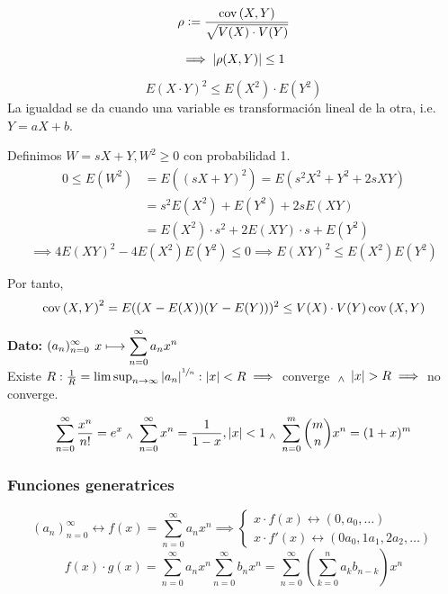 \begin{defn}
	\[\rho\vcentcolon= \frac{\operatorname{cov}\left(X, Y\right)}{\sqrt{V(X)\cdot V(Y)}}\]
\end{defn}
\[\implies \left|\rho(X, Y)\right| \leq 1\]
\begin{prop}
	\[E(X\cdot Y)^2 \leq E(X^2)\cdot E(Y^2)\]
	La igualdad se da cuando una variable es transformación lineal de la otra, i.e. $Y=aX+b$.
	\begin{dem}
		Definimos $W=sX+Y, W^2\geq 0$ con probabilidad 1.
		\begin{align*}
			0  \leq E\left(W^2\right) & =E\left((sX+Y)^2\right)=E\left(s^2X^2+Y^2+2sXY\right) \\
			                          & = s^2E\left(X^2\right)+E\left(Y^2\right)+2sE(XY)      \\
			                          & = E(X^2)\cdot s^2+2E(XY)\cdot s+E(Y^2)
		\end{align*}
		\[\implies 4E(XY)^2-4E\left(X^2\right)E\left(Y^2\right)\leq 0 \implies E(XY)^2\leq E\left(X^2\right)E\left(Y^2\right)\]
	\end{dem}
\end{prop}
Por tanto,
\[\operatorname{cov}\left(X, Y\right)^2 = E((X-E(X))(Y-E(Y)))^2 \leq V(X)\cdot V(Y)\operatorname{cov}\left(X, Y\right)\]



\textbf{Dato:} $\displaystyle (a_n)_{n=0}^\infty$ $\displaystyle x\longmapsto\sum_{n=0}^\infty a_nx^n$ \\
Existe $R : \frac{1}{R}=\limsup_{n\to\infty}\left|a_n\right|^{\sfrac{1}{n}} : \left|x\right| < R \implies$ converge $\; _{\wedge} \; \left|x\right| > R \implies $ no converge.
\begin{ejem}
	\[ \sum_{n=0}^\infty \frac{x^n}{n!} = e^x \; _{\wedge} \; \sum_{n=0}^\infty x^n = \frac{1}{1-x}, \left|x\right|<1 \; _{\wedge} \; \sum_{n=0}^m \binom{m}{n} x^n = (1+x)^m\]
\end{ejem}

\subsubsection{Funciones generatrices}
\[(a_n)_{n=0}^\infty \longleftrightarrow f(x)=\sum_{n=0}^\infty a_n x^n \implies \begin{cases}
		x\cdot f(x) \longleftrightarrow (0, a_0, \dots) \\
		x\cdot f'(x) \longleftrightarrow (0a_0, 1a_1, 2a_2, \dots)
	\end{cases}\]
\[f(x) \cdot g(x) = \sum_{n=0}^\infty a_n x^n \sum_{n=0}^\infty b_n x^n = \sum_{n=0}^\infty \left(\sum_{k=0}^n a_k b_{n-k}\right)x^n\]


